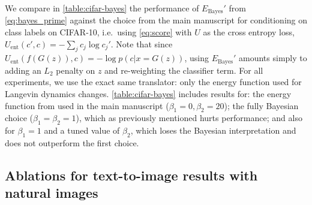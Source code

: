 \documentclass[nohyperref]{article}
\theoremstyle{plain}
\theoremstyle{definition}
\theoremstyle{remark}
\begin{document}
We compare in \autoref{table:cifar-bayes} the performance of $E_{\text{Bayes}}'$ from \eqref{eq:bayes_prime} against the choice from the main manuscript for conditioning on class labels on CIFAR-10, i.e.\ using \eqref{eq:score} with $U$ as the cross entropy loss, $U_{\text{ent}}(c', c) = -\sum_j c_j \log c_j'$. Note that since $U_{\text{ent}}(f(G(z)), c) = -\log p(c|x=G(z))$, using $E_{\text{Bayes}}'$ amounts simply to adding an $L_2$ penalty on $z$ and re-weighting the classifier term. For all experiments, we use the exact same translator: only the energy function used for Langevin dynamics changes. \autoref{table:cifar-bayes} includes results for: the energy function from used in the main manuscript ($\beta_1= 0, \beta_2=20$); the fully Bayesian choice ($\beta_1=\beta_2=1$), which as previously mentioned hurts performance; and also for $\beta_1=1$ and a tuned value of $\beta_2$, which loses the Bayesian interpretation and does not outperform the first choice.

\subsection{Ablations for text-to-image results with natural images}
\end{document}
